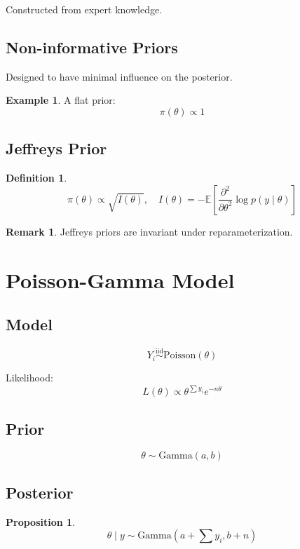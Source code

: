 \documentclass[12pt,oneside]{book}
\numberwithin{equation}{section}
\theoremstyle{definition}
\newtheorem{definition}{Definition}[section]
\newtheorem{example}{Example}[section]
\newtheorem{remark}{Remark}[section]
\theoremstyle{plain}
\newtheorem{proposition}{Proposition}[section]
\theoremstyle{remark}
\newcommand{\E}{\mathbb{E}}
\newcommand{\iid}{\overset{\text{iid}}{\sim}}
\newcommand{\Pois}{\mathrm{Poisson}}
\newcommand{\Gam}{\mathrm{Gamma}}
\begin{document}
Constructed from expert knowledge.

\subsection{Non-informative Priors}

Designed to have minimal influence on the posterior.

\begin{example}
A flat prior:
$$
\pi(\theta) \propto 1
$$
\end{example}

\subsection{Jeffreys Prior}

\begin{definition}
$$
\pi(\theta) \propto \sqrt{I(\theta)}, \quad I(\theta) = -\E\left[\frac{\partial^2}{\partial \theta^2}\log p(y \mid \theta)\right]
$$
\end{definition}

\begin{remark}
Jeffreys priors are invariant under reparameterization.
\end{remark}

\section{Poisson-Gamma Model}

\subsection{Model}

$$
Y_i \iid \Pois(\theta)
$$

Likelihood:
$$
L(\theta) \propto \theta^{\sum y_i} e^{-n\theta}
$$

\subsection{Prior}

$$
\theta \sim \Gam(a,b)
$$

\subsection{Posterior}

\begin{proposition}
$$
\theta \mid y \sim \Gam(a + \sum y_i, b + n)
$$
\end{proposition}
\end{document}
